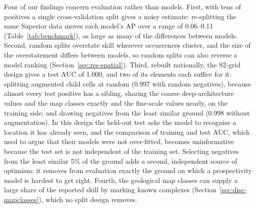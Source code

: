 \documentclass[pdflatex,sn-apa]{sn-jnl}
\begin{document}
Four of our findings concern evaluation rather than models. First, with tens of positives a single cross-validation split gives a noisy estimate: re-splitting the same Superior data moves each model's AP over a range of 0.06--0.11 (Table~\ref{tab:benchmark}), as large as many of the differences between models. Second, random splits overstate skill wherever occurrences cluster, and the size of the overstatement differs between models, so random splits can also reverse a model ranking (Section~\ref{sec:res-spatial}). Third, rebuilt nationally, the S2-grid design gives a test AUC of 1.000, and two of its elements each suffice for it: splitting augmented child cells at random (0.997 with random negatives), because almost every test positive has a sibling, sharing the coarse deep-architecture values and the map classes exactly and the fine-scale values nearly, on the training side; and drawing negatives from the least similar ground (0.998 without augmentation). In this design the held-out test asks the model to recognise a location it has already seen, and the comparison of training and test AUC, which \citet{Parsa2024} used to argue that their models were not over-fitted, becomes uninformative because the test set is not independent of the training set. Selecting negatives from the least similar 5\% of the ground adds a second, independent source of optimism: it removes from evaluation exactly the ground on which a prospectivity model is hardest to get right. Fourth, the geological map classes can supply a large share of the reported skill by marking known complexes (Section~\ref{sec:disc-mapclasses}), which no split design removes.
\end{document}
